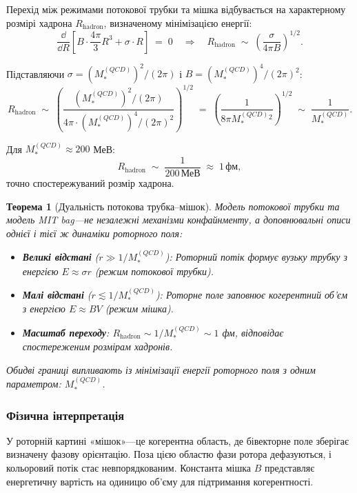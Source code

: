 \documentclass[11pt,a4paper]{article}
\theoremstyle{definition}
\theoremstyle{plain}
\newtheorem{theorem}{Теорема}[section]
\theoremstyle{remark}
\begin{document}
Перехід між режимами потокової трубки та мішка відбувається на характерному розмірі хадрона $R_{\mathrm{hadron}}$, визначеному мінімізацією енергії:
\begin{equation}
\frac{\dd}{\dd R}\left[B \cdot \frac{4\pi}{3}R^3 + \sigma \cdot R\right] \;=\; 0 \quad\Rightarrow\quad R_{\mathrm{hadron}} \;\sim\; \left(\frac{\sigma}{4\pi B}\right)^{1/2}.
\end{equation}

Підставляючи $\sigma = (M_*^{(QCD)})^2 / (2\pi)$ і $B = (M_*^{(QCD)})^4 / (2\pi)^2$:
\begin{equation}
R_{\mathrm{hadron}} \;\sim\; \left(\frac{(M_*^{(QCD)})^2 / (2\pi)}{4\pi \cdot (M_*^{(QCD)})^4 / (2\pi)^2}\right)^{1/2} \;=\; \left(\frac{1}{8\pi M_*^{(QCD)} {}^2}\right)^{1/2} \;\sim\; \frac{1}{M_*^{(QCD)}}.
\end{equation}

Для $M_*^{(QCD)} \approx 200$ МеВ:
\begin{equation}
R_{\mathrm{hadron}} \;\sim\; \frac{1}{200\,\text{МеВ}} \;\approx\; 1\,\text{фм},
\end{equation}
точно спостережуваний розмір хадрона.

\begin{theorem}[Дуальність потокова трубка–мішок]
Модель потокової трубки та модель MIT bag—не незалежні механізми конфайнменту, а доповнювальні описи однієї і тієї ж динаміки роторного поля:
\begin{itemize}[leftmargin=*,itemsep=3pt]
  \item \textbf{Великі відстані} ($r \gg 1/M_*^{(QCD)}$): Роторний потік формує вузьку трубку з енергією $E \approx \sigma r$ (режим потокової трубки).
  \item \textbf{Малі відстані} ($r \lesssim 1/M_*^{(QCD)}$): Роторне поле заповнює когерентний об'єм з енергією $E \approx B V$ (режим мішка).
  \item \textbf{Масштаб переходу}: $R_{\mathrm{hadron}} \sim 1/M_*^{(QCD)} \sim 1$ фм, відповідає спостереженим розмірам хадронів.
\end{itemize}
Обидві границі випливають із мінімізації енергії роторного поля з одним параметром: $M_*^{(QCD)}$.
\end{theorem}

\subsubsection{Фізична інтерпретація}

У роторній картині «мішок»—це когерентна область, де бівекторне поле зберігає визначену фазову орієнтацію. Поза цією областю фази ротора дефазуються, і кольоровий потік стає невпорядкованим. Константа мішка $B$ представляє енергетичну вартість на одиницю об'єму для підтримання когерентності.
\end{document}
